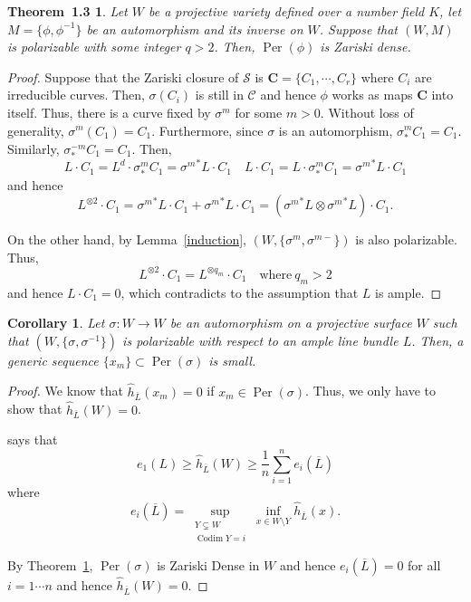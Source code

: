 \documentclass[11pt,letterpaper]{amsart}
\newtheorem*{thm**}{Theorem~1.3}
\newtheorem{cor}[thm]{Corollary}
\begin{document}
    \begin{thm**}\label{dense}
        Let $W$ be a projective variety defined over a number field $K$, let $M = \{\phi, \phi^{-1}\}$ be an automorphism and its inverse on $W$. Suppose that $(W,M)$ is polarizable with some integer $q>2$. Then, ${\operatorname{Per}}(\phi)$ is Zariski dense.
    \end{thm**}
    \begin{proof}
        Suppose that the Zariski closure of $\mathcal{S}$ is $\mathbf{C} = \{ C_1, \cdots , C_r\}$ where $C_i$ are irreducible curves.
        Then, $\sigma(C_i)$ is still in $\mathcal{C}$ and hence $\phi$ works as maps $\mathbf{C}$ into itself. Thus, there is a curve fixed by $\sigma^{m}$ for some $m>0$. Without loss of generality, $\sigma^m(C_1) = C_1$. Furthermore, since $\sigma$ is an automorphism,
        $\sigma^m_*C_1 = C_1$. Similarly, $\sigma^{-m}_*C_1 = C_1$.  Then,
        \[
        L \cdot C_1 = L^d \cdot \sigma^m_* C_1 = {\sigma^m}^*L \cdot C_1  \quad L \cdot C_1 = L \cdot \sigma^m_* C_1 = {\sigma^m}^*L \cdot C_1
        \]
        and hence
        \[
        L^{\otimes 2}  \cdot C_1 = {\sigma^m}^*L \cdot C_1  +  {\sigma^m}^*L \cdot C_1 =  \left({\sigma^m}^*L \otimes  {\sigma^m}^*L \right)\cdot C_1.
        \]

        On the other hand, by Lemma~\ref{induction}, $(W, \{\sigma^m, \sigma^{m-}\})$ is also polarizable. Thus,
        \[
        L^{\otimes 2}  \cdot C_1 = L^{\otimes q_m}  \cdot C_1 \quad \text{where}~q_m >2
        \]
        and hence $L  \cdot C_1 = 0$, which contradicts to the assumption that $L$ is ample.
    \end{proof}

    \begin{cor}
        Let $\sigma :W \rightarrow W$ be an automorphism on a projective surface $W$ such that $(W, \{ \sigma, \sigma^{-1}\})$ is polarizable
        with respect to an ample line bundle $L$. Then, a generic sequence $\{ x_m\} \subset {\operatorname{Per}}(\sigma)$ is small.
    \end{cor}
    \begin{proof}
        We know that $\widehat{h}_{\overline{L}}(x_m)=0$ if $x_m \in {\operatorname{Per}}(\sigma)$. Thus, we only have to show that
        $\widehat{h}_{\overline{L}}(W)=0$.

        \cite[Theorem 1.10]{Z1} says that
        \[
        e_1(L)   \geq
        \widehat{h}_{\overline{L}}(W) \geq \dfrac{1}{n} \sum_{i=1}^n e_i (\overline{L})
        \]
        where
        \[
        e_i(\overline{L})
        = \sup_{\substack{Y \subsetneq W \\ \operatorname{Codim} Y = i}} \inf_{x \in W \setminus Y} \widehat{h}_{\overline{L}} (x).
        \]

        By Theorem~\ref{dense}, ${\operatorname{Per}}(\sigma)$ is Zariski Dense in $W$ and hence $e_i(\overline{L}) =0$ for all $i = 1 \cdots n$ and hence $\widehat{h}_{\overline{L}}(W) =0$.
    \end{proof}
\end{document}
